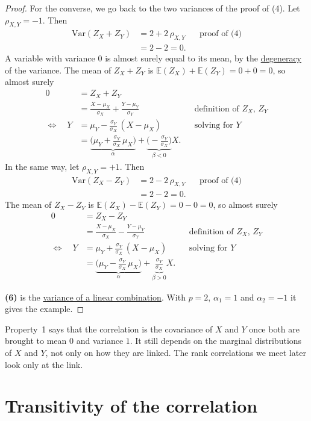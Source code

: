\documentclass[a4paper,12pt,oneside]{report}
\begin{document}
\begin{proof}
For the converse, we go back to the two variances of the proof of (4). Let
$\rho_{X,Y}=-1$. Then
\begin{align*}
\mathrm{Var}(Z_X+Z_Y)
&=2+2\,\rho_{X,Y}
&&\text{proof of (4)}\\
&=2-2=0 .
\end{align*}
A variable with variance $0$ is almost surely equal to its mean, by the
\hyperref[prop:var-zero]{degeneracy} of the variance. The mean of
$Z_X+Z_Y$ is $\mathbb{E}(Z_X)+\mathbb{E}(Z_Y)=0+0=0$, so almost surely
\begin{align*}
0&=Z_X+Z_Y\\
&=\frac{X-\mu_X}{\sigma_X}+\frac{Y-\mu_Y}{\sigma_Y}
&&\text{definition of $Z_X$, $Z_Y$}\\
\Longleftrightarrow\quad
Y&=\mu_Y-\frac{\sigma_Y}{\sigma_X}\,(X-\mu_X)
&&\text{solving for $Y$}\\
&=\underbrace{\Big(\mu_Y+\frac{\sigma_Y}{\sigma_X}\,\mu_X\Big)}_{\alpha}
+\underbrace{\Big(-\frac{\sigma_Y}{\sigma_X}\Big)}_{\beta<0}X .
\end{align*}
In the same way, let $\rho_{X,Y}=+1$. Then
\begin{align*}
\mathrm{Var}(Z_X-Z_Y)
&=2-2\,\rho_{X,Y}
&&\text{proof of (4)}\\
&=2-2=0 .
\end{align*}
The mean of $Z_X-Z_Y$ is $\mathbb{E}(Z_X)-\mathbb{E}(Z_Y)=0-0=0$, so
almost surely
\begin{align*}
0&=Z_X-Z_Y\\
&=\frac{X-\mu_X}{\sigma_X}-\frac{Y-\mu_Y}{\sigma_Y}
&&\text{definition of $Z_X$, $Z_Y$}\\
\Longleftrightarrow\quad
Y&=\mu_Y+\frac{\sigma_Y}{\sigma_X}\,(X-\mu_X)
&&\text{solving for $Y$}\\
&=\underbrace{\Big(\mu_Y-\frac{\sigma_Y}{\sigma_X}\,\mu_X\Big)}_{\alpha}
+\underbrace{\frac{\sigma_Y}{\sigma_X}}_{\beta>0}X .
\end{align*}

\textbf{(6)} is the \hyperref[prop:var-linear]{variance of a linear
combination}. With $p=2$, $\alpha_1=1$ and $\alpha_2=-1$ it gives the
example.
\end{proof}

Property~1 says that the correlation is the covariance of $X$ and $Y$ once
both are brought to mean $0$ and variance $1$. It still depends on the
marginal distributions of $X$ and $Y$, not only on how they are linked.
The rank correlations we meet later look only at the link.

\section{Transitivity of the correlation}\label{sec:corr-transitivity}
\end{document}
